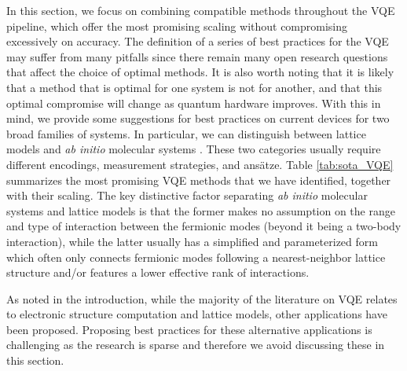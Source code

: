 In this section, we focus on combining compatible methods throughout the VQE pipeline, which offer the most promising scaling without compromising excessively on accuracy. The definition of a series of best practices for the VQE may suffer from many pitfalls since there remain many open research questions that affect the choice of optimal methods. It is also worth noting that it is likely that a method that is optimal for one system is not for another, and that this optimal compromise will change as quantum hardware improves.
With this in mind, we provide some suggestions for best practices on current devices for two broad families of systems. In particular, we can distinguish between lattice models \cite{Clark1997, nemoshkalenko1998computational,Marder2010, Continentino2021} and \textit{ab initio} molecular systems \cite{Parr1990, Friesner2005, Szabo1996, Jensen2017}. These two categories usually require different encodings, measurement strategies, and ans{\"{a}}tze. Table \ref{tab:sota_VQE} summarizes the most promising VQE methods that we have identified, together with their scaling. 
The key distinctive factor separating \textit{ab initio} molecular systems and lattice models is that the former makes no assumption on the range and type of interaction between the fermionic modes (beyond it being a two-body interaction), while the latter usually has a simplified and parameterized form which often only connects fermionic modes following a nearest-neighbor lattice structure and/or features a lower effective rank of interactions. 

As noted in the introduction, while the majority of the literature on VQE relates to electronic structure computation and lattice models, other applications have been proposed. Proposing best practices for these alternative applications is challenging as the research is sparse and therefore we avoid discussing these in this section. 

